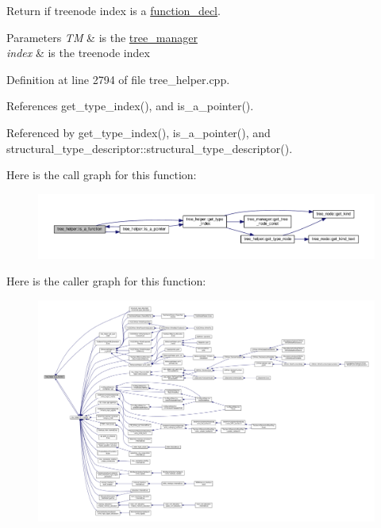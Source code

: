 Return if treenode index is a \hyperlink{structfunction__decl}{function\+\_\+decl}. 


\begin{DoxyParams}{Parameters}
{\em TM} & is the \hyperlink{classtree__manager}{tree\+\_\+manager} \\
\hline
{\em index} & is the treenode index \\
\hline
\end{DoxyParams}


Definition at line 2794 of file tree\+\_\+helper.\+cpp.



References get\+\_\+type\+\_\+index(), and is\+\_\+a\+\_\+pointer().



Referenced by get\+\_\+type\+\_\+index(), is\+\_\+a\+\_\+pointer(), and structural\+\_\+type\+\_\+descriptor\+::structural\+\_\+type\+\_\+descriptor().

Here is the call graph for this function\+:
\nopagebreak
\begin{figure}[H]
\begin{center}
\leavevmode
\includegraphics[width=350pt]{d7/d99/classtree__helper_aa6612c96f6dd64598da3311387939635_cgraph}
\end{center}
\end{figure}
Here is the caller graph for this function\+:
\nopagebreak
\begin{figure}[H]
\begin{center}
\leavevmode
\includegraphics[width=350pt]{d7/d99/classtree__helper_aa6612c96f6dd64598da3311387939635_icgraph}
\end{center}
\end{figure}
\mbox{\label{classtree__helper_aa81c329e263e98a34db9f443eeac94ca}} 
